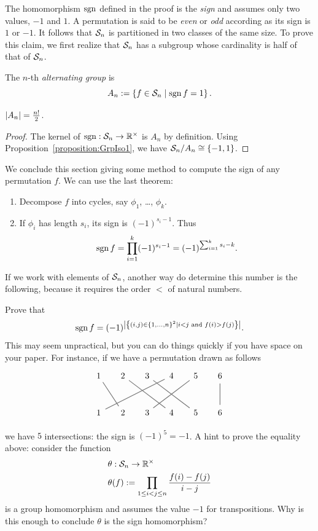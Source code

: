 The homomorphism \(\operatorname{sgn}\) defined in the proof is the {\em sign} and assumes only two values, \(-1\) and \(1\). A permutation is said to be {\em even} or {\em odd} according as its sign is \(1\) or \(-1\). It follows that \(\mathcal S_n\) is partitioned in two classes of the same size. To prove this claim, we first realize that \(\mathcal S_n\) has a subgroup whose cardinality is half of that of \(\mathcal S_n\).

\begin{definition}
The \(n\)-th {\em alternating group} is
\[A_n := \left\{f \in \mathcal S_n \mid \operatorname{sgn} f = 1\right\} .\]
\end{definition}

\begin{proposition}
\(\left\lvert A_n\right\rvert = \frac{n!}{2}\).
\end{proposition}

\begin{proof}
The kernel of \(\operatorname{sgn} : \mathcal S_n \to \mathbb R^\times\) is \(A_n\) by definition. Using Proposition~\ref{proposition:GrpIso1}, we have \({\mathcal S_n}{/}{A_n} \cong \left\{-1, 1\right\}\).
\end{proof}

We conclude this section giving some method to compute the sign of any permutation \(f\). We can use the last theorem:
\begin{enumerate}
\item Decompose \(f\) into cycles, say \(\phi_1\), \dots{}, \(\phi_k\).
\item If \(\phi_i\) has length \(s_i\), its sign is \((-1)^{s_i-1}\). Thus
\[\operatorname{sgn} f = \prod_{i=1}^k (-1)^{s_i-1} = (-1)^{\sum_{i=1}^k s_i -k} .\]
\end{enumerate}

If we work with elements of \(\mathcal S_n\), another way do determine this number is the following, because it requires the order \(<\) of natural numbers.

\begin{exercise}
Prove that
\[\operatorname{sgn} f = (-1)^{\left\lvert\left\{(i, j) \in \left\{1, \dots{}, n\right\}^2 \mid i < j \text{ and } f(i) > f(j)\right\}\right\rvert} .\]
This may seem unpractical, but you can do things quickly if you have space on your paper. For instance, if we have a permutation drawn as follows
\[\begin{tikzpicture}
\foreach \i/\j in {1/2, 2/4, 3/5, 4/1, 5/3, 6/6} {
	\node (x\i) [circle] at (\i cm, .75cm) {\(\i\)};
	\node (y\j) [circle] at (\j cm, -.75cm) {\(\j\)};
	\draw [thick, white!45!black] (x\i) -- (y\j);
}
\end{tikzpicture}\]
we have \(5\) intersections: the sign is \((-1)^5 = -1\). A hint to prove the equality above: consider the function
\begin{align*}
& \theta : \mathcal S_n \to \mathbb R^\times \\
& \theta(f) := \prod_{1 \le i < j \le n} \frac{f(i)-f(j)}{i-j}
\end{align*}
is a group homomorphism and assumes the value \(-1\) for transpositions. Why is this enough to conclude \(\theta\) is the sign homomorphism?
\end{exercise}
